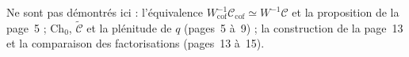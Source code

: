 Ne sont pas démontrés ici : l'équivalence $W_{\mathrm{cof}}^{-1}\mathcal C_{\mathrm{cof}} \simeq W^{-1}\mathcal C$ et la proposition de la page~5 ; $\mathrm{Ch}_0$, $\widetilde{\mathcal C}$ et la plénitude de $q$ (pages~5 à~9) ; la construction de la page~13 et la comparaison des factorisations (pages~13 à~15).
